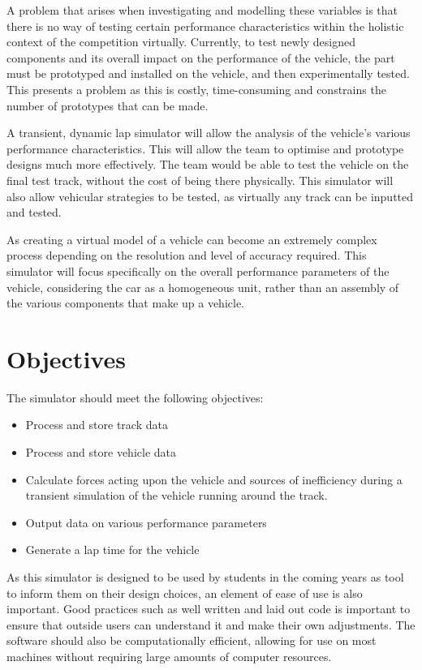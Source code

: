 \documentclass[11pt]{article}
\numberwithin{equation}{section}
\begin{document}
A problem that arises when investigating and modelling these variables is that there is no way of testing certain performance characteristics within the holistic context of the competition virtually. Currently, to test newly designed components and its overall impact on the performance of the vehicle, the part must be prototyped and installed on the vehicle, and then experimentally tested. This presents a problem as this is costly, time-consuming and constrains the number of prototypes that can be made.

A transient, dynamic lap simulator will allow the analysis of the vehicle's various performance characteristics. This will allow the team to optimise and prototype designs much more effectively. The team would be able to test the vehicle on the final test track, without the cost of being there physically. This simulator will also allow vehicular strategies to be tested, as virtually any track can be inputted and tested. 

As creating a virtual model of a vehicle can become an extremely complex process depending on the resolution and level of accuracy required. This simulator will focus specifically on the overall performance parameters of the vehicle, considering the car as a homogeneous unit, rather than an assembly of the various components that make up a vehicle. 
\section{Objectives}
The simulator should meet the following objectives:
\begin{itemize}
    \item Process and store track data
    \item Process and store vehicle data
    \item Calculate forces acting upon the vehicle and sources of inefficiency during a transient simulation of the vehicle running around the track.
    \item Output data on various performance parameters
    \item Generate a lap time for the vehicle
\end{itemize}
As this simulator is designed to be used by students in the coming years as tool to inform them on their design choices, an element of ease of use is also important. Good practices such as well written and laid out code is important to ensure that outside users can understand it and make their own adjustments. The software should also be computationally efficient, allowing for use on most machines without requiring large amounts of computer resources. 
\end{document}
